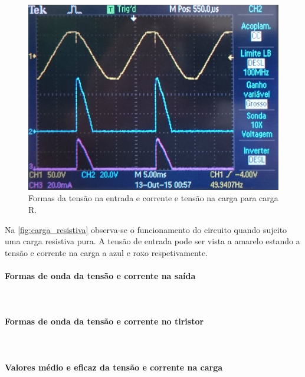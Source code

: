 \documentclass[a4paper,11pt]{article}
\numberwithin{equation}{section}
\begin{document}
\begin{figure}[H]
	\centering
	\includegraphics[keepaspectratio=true, scale=0.12]{img/figs/carga_resistiva}
	\caption{Formas da tensão na entrada e corrente e tensão na carga para carga R.}
	\label{fig:carga_resistiva}
	\vspace{-0.8em}
\end{figure}


Na \autoref{fig:carga_resistiva} observa-se o funcionamento do circuito quando sujeito uma carga resistiva pura. A tensão de entrada pode ser vista a amarelo estando a tensão e corrente na carga a azul e roxo respetivamente.

\paragraph{Formas de onda da tensão e corrente na saída}\mbox{}\



\paragraph{Formas de onda da tensão e corrente no tiristor}\mbox{}\


\paragraph{Valores médio e eficaz da tensão e corrente na carga}\mbox{}\
\end{document}

